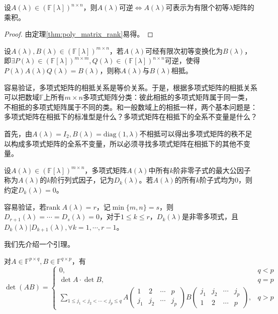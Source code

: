         \begin{theorem}
            设$A(\lambda)\in(\mathbb{F}[\lambda])^{n\times n}$，则$A(\lambda)$可逆$\Leftrightarrow A(\lambda)$可表示为有限个初等$\lambda$矩阵的乘积。
        \end{theorem}

        \begin{proof}
            由定理\ref{thm:poly_matrix_rank}易得。
        \end{proof}

        \begin{definition}[多项式矩阵的相抵]
            设$A(\lambda), B(\lambda)\in(\mathbb{F}[\lambda])^{m\times n}$，若$A(\lambda)$可经有限次初等变换化为$B(\lambda)$，即$\exists P(\lambda)\in(\mathbb{F}[\lambda])^{m\times m}, Q(\lambda)\in(\mathbb{F}[\lambda])^{n\times n}$可逆，使得$P(\lambda)A(\lambda)Q(\lambda)=B(\lambda)$，则称$A(\lambda)$与$B(\lambda)$相抵。
        \end{definition}

        容易验证，多项式矩阵的相抵关系是等价关系。于是，根据多项式矩阵的相抵关系可以把数域$\mathbb{F}$上所有$m\times n$多项式矩阵分类：彼此相抵的多项式矩阵属于同一类，不相抵的多项式矩阵属于不同的类。和一般数域上的相抵一样，两个基本问题是：多项式矩阵在相抵下的标准型是什么？多项式矩阵在相抵下的全系不变量是什么？

        首先，由$A(\lambda)=I_2,B(\lambda)=\mathrm{diag}(1,\lambda)$不相抵可以得出多项式矩阵的秩不足以构成多项式矩阵的全系不变量，所以必须寻找多项式矩阵在相抵下的其他不变量。

        \begin{definition}
            设$A(\lambda)\in(\mathbb{F}[\lambda])^{m\times n}$，多项式矩阵$A(\lambda)$中所有$k$阶非零子式的最大公因子称为$A(\lambda)$的$k$阶行列式因子，记为$D_k(\lambda)$。若$A(\lambda)$的所有$k$阶子式均为0，则约定$D_k(\lambda)=0$。
        \end{definition}

        容易验证，若$\mathrm{rank}\;A(\lambda)=r$，记$\min\{m,n\}=s$，则$D_{r+1}(\lambda)=\cdots=D_s(\lambda)=0$，对于$1\leq k\leq r$，$D_k(\lambda)$是非零多项式，且$D_k(\lambda)|D_{k+1}(\lambda),\forall k=1,\cdots,r-1$。

        我们先介绍一个引理。

        \begin{lemma}
            \label{lemma:binet_cauchy}
            对$A\in\mathbb{F}^{p\times q}, B\in\mathbb{F}^{q\times p}$，有
            \[
                \det (AB)=\begin{cases}0,&q<p\\\det A\cdot\det B,&q=p\\\sum\limits_{1\leq j_1<j_2<\cdots<j_p\leq q}A\begin{pmatrix}1&2&\cdots&p\\j_1&j_2&\cdots&j_p\end{pmatrix}B\begin{pmatrix}j_1&j_2&\cdots&j_p\\1&2&\cdots&p\end{pmatrix},&q>p\end{cases}
            \]
        \end{lemma}

